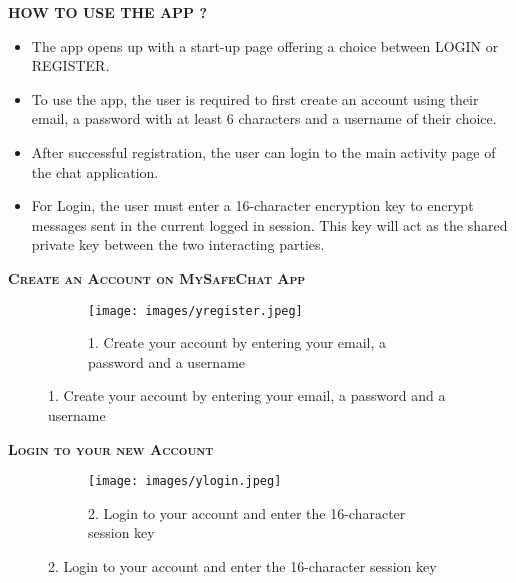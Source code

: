 \documentclass{beamer}
\begin{document}
\begin{frame}
\begin{tcolorbox}
\begin{center}
\textsc{\textbf{\textcolor{byzantium}{HOW TO USE THE APP ?}}}
\end{center} 
\end{tcolorbox}
\begin{flushleft}
\begin{itemize}
\item The app opens up with a start-up page offering a choice between LOGIN or REGISTER.
\item To use the app, the user is required to first create an account using their email, a password with at least 6 characters and a username of their choice.
\item After successful registration, the user can login to the main activity page of the chat application.
\item For Login, the user must enter a 16-character encryption key to encrypt messages sent in the current logged in session. This key will act as the shared private key between the two interacting parties.
\end{itemize}
\end{flushleft}
\end{frame}

\begin{frame}
\begin{tcolorbox}
\begin{center}
\textsc{\textbf{\textcolor{byzantium}{Create an Account on MySafeChat App}}}
\end{center}
\end{tcolorbox}
\begin{figure}
\centering
\begin{subfigure}{\textwidth}
  \centering
  \texttt{[image: images/yregister.jpeg]}
  \caption{1. Create your account by entering your email, a password and a username}
  \label{fig:sub1}
\end{subfigure}
\end{figure}
\end{frame}

\begin{frame}
\begin{tcolorbox}
\begin{center}
\textsc{\textbf{\textcolor{byzantium}{Login to your new Account}}}
\end{center}
\end{tcolorbox}
\begin{figure}
\centering
\begin{subfigure}{\textwidth}
  \centering
  \texttt{[image: images/ylogin.jpeg]}
  \caption{2. Login to your account and enter the 16-character session key }
  \label{fig:sub1}
\end{subfigure}
\end{figure}
\end{frame}
\end{document}
